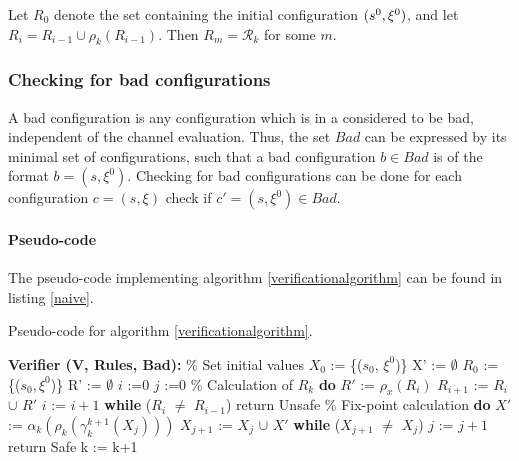 Let $R_0$ denote the set containing the initial configuration $(s^0, \xi^0)$, and let $R_i = R_{i-1} \cup \rho_k(R_{i-1})$. Then $R_m = \mathcal{R}_k$ for some $m$.

\subsubsection{Checking for bad configurations}
\label{part3}
A bad configuration is any configuration which is in a  considered to be bad, independent of the channel evaluation. Thus, the set $Bad$ can be expressed by its minimal set of configurations, such that a bad configuration $b \in Bad$ is of the format $b = (s, \xi^0)$. Checking for bad configurations can be done for each configuration $c = (s, \xi)$ check if $c' = (s, \xi^0) \in Bad$.


\paragraph{Pseudo-code}
The pseudo-code implementing algorithm \ref{verificationalgorithm} can be found in listing \ref{naive}. 

\begin{algorithm}
  \caption{Pseudo-code for algorithm \ref{verificationalgorithm}.}
	\label{naive}
  \begin{algorithmic}[1]
    \State \textbf{Verifier (V, Rules, Bad):}
	\State \% Set initial values
	\State $X_0$ := \{($s_0$, $\xi^0$)\}
	\State X' := $\emptyset$
	\State $R_0$ := \{($s_0, \xi^0$)\}
	\State R' := $\emptyset$
	\State $i$ :=$0$
	\State $j$ :=$0$
	\State
	\State \% Calculation of $R_k$
	\State \textbf{do}
        \State \hspace{10pt} $R'$ := $\rho_x(R_i)$
	\State \hspace{10pt} $R_{i+1}$ := $R_i$ $\cup$ $R'$
	\State \hspace{10pt} $i$ := $i+1$
	\State \textbf{while} ($R_i$ $\neq$ $R_{i-1}$)
        \State return Unsafe
        \EndIf 
	\State 
	\State \% Fix-point calculation
	\State \textbf{do}
        \State \hspace{10pt} $X'$ := $\alpha_k(\rho_k(\gamma_k^{k+1}(X_j)))$
	\State \hspace{10pt} $X_{j+1}$ := $X_j$ $\cup$ $X'$
	\State \hspace{10pt} \textbf{while} ($X_{j+1}$ $\neq$ $X_j$)
	\State \hspace{10pt} $j$ := $j+1$
        \State return Safe
        \EndIf
        \State k := k+1
      \EndFor
\end{algorithmic}
\end{algorithm}

